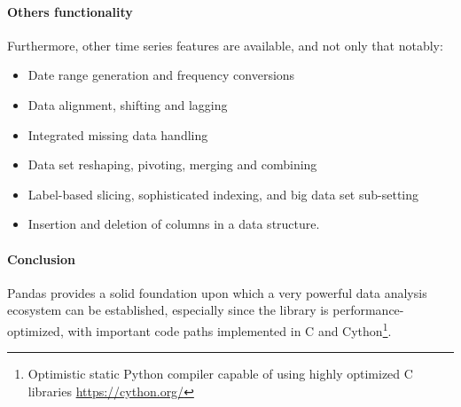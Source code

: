\paragraph{Others functionality}
Furthermore, other time series features are available, and not only that notably:
\begin{itemize}
    \item Date range generation and frequency conversions
    \item Data alignment, shifting and lagging
    \item Integrated missing data handling
    \item Data set reshaping, pivoting, merging and combining
    \item Label-based slicing, sophisticated indexing, and big data set sub-setting
    \item Insertion and deletion of columns in a data structure.
\end{itemize}
\paragraph{Conclusion}
Pandas provides a solid foundation upon which a very powerful data analysis ecosystem can be established, especially since the library is performance-optimized,
with important code paths implemented in C and Cython\footnote{Optimistic static Python compiler capable of using highly optimized C libraries \url{https://cython.org/}}.
